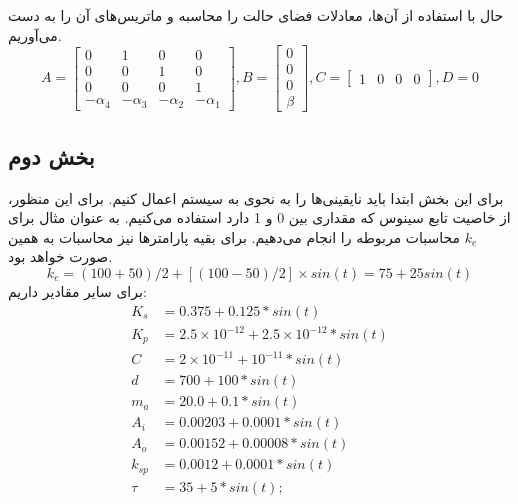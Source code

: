 \documentclass[14pt, a4paper]{extarticle}
\begin{document}
حال با استفاده از آن‌ها، معادلات فضای حالت را محاسبه و ماتریس‌های آن را به دست می‌آوریم.\\
\[
A = 
\begin{bmatrix}
	0 & 1 & 0 &  0 \\
	0 & 0 & 1 &  0 \\
	0 & 0 & 0 &  1 \\
	-\alpha_4 & -\alpha_3 & -\alpha_2 & -\alpha_1
\end{bmatrix}, 
B = \begin{bmatrix}
	0 \\
	0 \\
	0 \\
	\beta
\end{bmatrix}, 
C = \begin{bmatrix}
	1 & 0 & 0 & 0
\end{bmatrix}, D = 0
\]
\newpage
\subsection{بخش دوم}
برای این بخش ابتدا باید نایقینی‌ها را به نحوی به سیستم اعمال کنیم. برای این منظور، از خاصیت تابع سینوس که مقداری بین 0 و 1 دارد استفاده می‌کنیم. به عنوان مثال برای 
$k_e$
محاسبات مربوطه را انجام می‌دهیم. برای بقیه پارامترها نیز محاسبات به همین صورت خواهد بود.\\
\[
k_e = (100 + 50)/2 + [(100 - 50)/2] \times sin(t) = 75 + 25 sin(t)
\]
برای سایر مقادیر داریم:\\
\[
\begin{aligned}
K_s &= 0.375 + 0.125 * sin(t)\\           
K_p &= 2.5 \times 10^{-12} + 2.5 \times 10^{-12} * sin(t)\\       
C &= 2 \times 10^{-11} + 10^{-11} * sin(t)\\            
d &= 700 + 100 * sin(t)\\              
m_a &= 20.0 + 0.1 * sin(t)\\             
A_i &= 0.00203 + 0.0001 * sin(t)\\       
A_o &= 0.00152 + 0.00008 * sin(t)\\      
k_{sp} &= 0.0012 + 0.0001 * sin(t)\\      
\tau &= 35 + 5 * sin(t);  
\end{aligned}
\]
\end{document}
